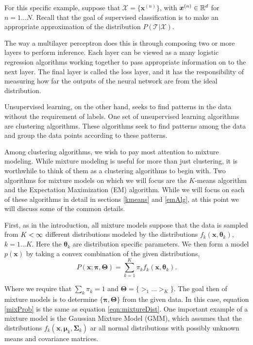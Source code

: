 For this specific example, suppose that \(\mathcal{X}=\{\bm x^{(n)}\}\), 
with \(\bm x^{(n)}\in \mathbb R^d\) for \(n=1\ldots N\). Recall that the goal of 
supervised classification is to make an appropriate approximation of the 
distribution \(P(\mathcal{T}|\mathcal{X})\). 

The way a multilayer perceptron does this is through composing two or more
layers to perform inference.  Each layer can be viewed as a many logistic 
regression algorithms working together to pass appropriate information on to 
the next layer.  The final layer is called the loss layer, and it has the 
responsibility of measuring how far the outputs of the neural network are
from the ideal distribution.

Unsupervised learning, on the other hand, seeks to find patterns in the data
without the requirement of labels.  One set of unsupervised learning 
algorithms are clustering algorithms.  These algorithms seek to find patterns 
among the data and group the data points according to these patterns. 

Among clustering algorithms, we wish to pay most attention to mixture modeling.
While mixture modeling is useful for more than just clustering, it is 
worthwhile to think of them as a clustering algorithms to begin with.  Two 
algorithms for mixture models on which we will focus are the $K$-means algorithm and the 
Expectation Maximization (EM) algorithm.  While we will focus on each of these 
algorithms in detail in sections \ref{kmeans} and \ref{emAlg}, at this point we will 
discuss some of the common details.

First, as in the introduction, all mixture models suppose that the data is sampled from $K<\infty$ 
different distributions modeled by the distributions 
$f_k(\bm x,\bm \theta_k)$, $k=1\ldots K$. Here the $\bm\theta_k$ are 
distribution specific parameters. We then form a model $p(\bm x)$ by taking a 
convex combination of the given distributions,
\begin{equation}\label{mixProb}
		P(\bm x;\bm\pi,\bm\Theta)=\sum_{k=1}^{K}\pi_kf_k(\bm x,\bm\theta_k).
\end{equation}

Where we require that $\sum_k \pi_k =1$ and 
$\bm\Theta = \{\bm\gt_1\ldots\bm\gt_K\}$. The goal then of mixture models is 
to determine $\{\bm\pi,\bm\Theta\}$ from the given data. In this case, equation \ref{mixProb} is the same as equation \ref{eqn:mixtureDist}.  One important example of a mixture model is the Gaussian Mixture Model (GMM), which assumes that the distributions \( f_k(\bm x,\bm \mu_k,\bm \Sigma_k) \) ar all normal distributions with possibly unknown means and covariance matrices.

